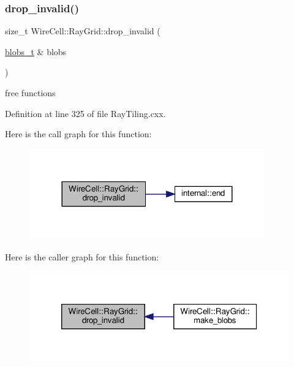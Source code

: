 \subsubsection{\texorpdfstring{drop\+\_\+invalid()}{drop\_invalid()}}
{\footnotesize\ttfamily size\+\_\+t Wire\+Cell\+::\+Ray\+Grid\+::drop\+\_\+invalid (\begin{DoxyParamCaption}\item[{\hyperlink{namespace_wire_cell_1_1_ray_grid_aea2069aff62790df3241ee7446e81ade}{blobs\+\_\+t} \&}]{blobs }\end{DoxyParamCaption})}



free functions 



Definition at line 325 of file Ray\+Tiling.\+cxx.

Here is the call graph for this function\+:
\nopagebreak
\begin{figure}[H]
\begin{center}
\leavevmode
\includegraphics[width=288pt]{namespace_wire_cell_1_1_ray_grid_a11febee1f22df148439d0782ffb754f4_cgraph}
\end{center}
\end{figure}
Here is the caller graph for this function\+:
\nopagebreak
\begin{figure}[H]
\begin{center}
\leavevmode
\includegraphics[width=320pt]{namespace_wire_cell_1_1_ray_grid_a11febee1f22df148439d0782ffb754f4_icgraph}
\end{center}
\end{figure}
\mbox{\label{namespace_wire_cell_1_1_ray_grid_a096e166d076b5ecaec0412ebb7f54f9e}} 
